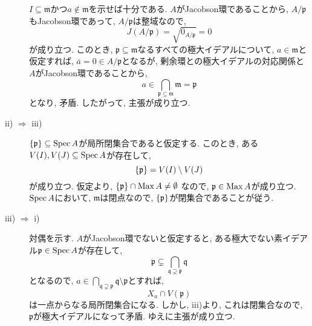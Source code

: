 \documentclass[dvipdfmx]{jsarticle}
\begin{document}
\begin{problem}
\begin{description}
            $I \subseteq \mathfrak{m}$かつ$a \notin \mathfrak{m}$を示せば十分である.
            $A$がJacobson環であることから, $A/\mathfrak{p}$もJacobson環であって,
            $A/\mathfrak{p}$は整域なので,
            \[
                J(A/\mathfrak{p}) = \sqrt{0_{A/\mathfrak{p}}} = 0
            \]
            が成り立つ.
            このとき, $\mathfrak{p} \subseteq \mathfrak{m}$なるすべての極大イデアルについて, $a \in \mathfrak{m}$と仮定すれば,
            $\overline{a} = 0 \in A/\mathfrak{p}$となるが,
            剰余環との極大イデアルの対応関係と$A$がJacobson環であることから,
            \[
                a \in \bigcap_{\mathfrak{p} \subseteq \mathfrak{m}} \mathfrak{m} = \mathfrak{p}
            \]
            となり, 矛盾.
            したがって, 主張が成り立つ.
            \item[ii) $\Rightarrow$ iii)]
            $\{\mathfrak{p}\} \subseteq \operatorname{Spec}{A}$が局所閉集合であると仮定する.
            このとき, ある$V(I), V(J) \subseteq \operatorname{Spec}{A}$が存在して,
            \[
                \{\mathfrak{p}\} = V(I) \setminus V(J)
            \]
            が成り立つ.
            仮定より, $\{\mathfrak{p}\} \cap \operatorname{Max}{A} \neq \emptyset$
            なので, $\mathfrak{p} \in \operatorname{Max}{A}$が成り立つ.
            $\operatorname{Spec}{A}$において, $\mathfrak{m}$は閉点なので, $\{\mathfrak{p}\}$が閉集合であることが従う.
            \item [iii) $\Rightarrow$ i)]
            対偶を示す.
            $A$がJacobson環でないと仮定すると, ある極大でない素イデアル$\mathfrak{p} \in \operatorname{Spec}{A}$が存在して,
            \[
                \mathfrak{p} \subsetneq \bigcap_{\mathfrak{q} \supsetneq \mathfrak{p}} \mathfrak{q}
            \]
            となるので, $a \in  \bigcap_{\mathfrak{q} \supsetneq \mathfrak{p}} \mathfrak{q} \setminus \mathfrak{p}$とすれば,
            \[
               X_a \cap V(\mathfrak{p})
            \]
            は一点からなる局所閉集合になる.
            しかし, iii)より, これは閉集合なので, $\mathfrak{p}$が極大イデアルになって矛盾.
            ゆえに主張が成り立つ.
        \end{description}
    \end{problem}
\end{document}

